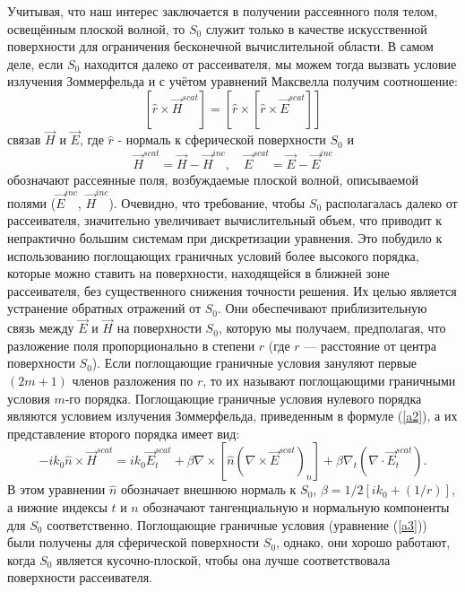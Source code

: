 Учитывая, что наш интерес заключается в получении рассеянного поля телом, освещённым плоской волной, то $S_{0}$ служит только в качестве искусственной поверхности для ограничения бесконечной вычислительной области. В самом деле, если $S_{0}$ находится далеко от рассеивателя, мы можем тогда вызвать условие излучения Зоммерфельда и с учётом уравнений Максвелла получим соотношение:
\begin{equation}\label{a2}
	\left[\hat{r} \times \vec{H}^{scat}\right] = \left[\hat{r} \times \left[\hat{r} \times \vec{E}^{scat}\right]\right]
\end{equation}
		связав $ \vec{H} $ и $ \vec{E} $, где $ \hat{r} $ - нормаль к сферической поверхности $ S_{0} $ и
\begin{equation}
	\vec{H}^{scat} = \vec{H} - \vec{H}^{inc},\quad \vec{E}^{scat} = \vec{E} - \vec{E}^{inc}
\end{equation}
обозначают рассеянные поля, возбуждаемые плоской волной, описываемой полями ($ \vec{E}^{inc} $, $ \vec{H}^{inc} $).
Очевидно, что требование, чтобы $ S_{0} $ располагалась далеко от рассеивателя, значительно увеличивает вычислительный объем, что приводит к непрактично большим системам при дискретизации уравнения. Это побудило к использованию поглощающих граничных условий более высокого порядка, которые можно ставить на поверхности, находящейся в ближней зоне рассеивателя, без существенного снижения точности решения. Их целью является устранение обратных отражений от $ S_{0} $. Они обеспечивают приблизительную связь между $\vec{E}$ и $\vec{H}$ на поверхности $ S_{0} $, которую мы получаем, предполагая, что разложение поля пропорционально в степени $r$ (где $r$ --- расстояние от центра поверхности $S_{0}$). Если поглощающие граничные условия зануляют первые $(2m + 1)$ членов разложения по $r$, то их называют поглощающими граничными условия $m$-го порядка.
Поглощающие граничные условия нулевого порядка являются условием излучения Зоммерфельда, приведенным в формуле (\ref{a2}), а их представление второго порядка имеет вид:
\begin{equation}\label{a3}
	-i k_{0}\hat{n} \times \vec{H}^{scat} = i k_{0}\vec{E}_{t}^{scat} + \beta \nabla \times [\hat{n}(\nabla \times \vec{E}^{scat})_{n}] + \beta\nabla_{t} (\nabla \cdot \vec{E}_{t}^{scat}).
\end{equation}
В этом уравнении $ \hat{n} $ обозначает внешнюю нормаль к $S_{0}$, $\beta = 1/{2[i k_{0} + (1/r)]}$, а нижние индексы $t$ и $n$ обозначают тангенциальную и нормальную компоненты для $ S_{0} $ соответственно. 
Поглощающие граничные условия (уравнение (\ref{a3})) были получены для сферической поверхности $ S_{0} $, однако, они хорошо работают, когда $ S_{0} $ является кусочно-плоской, чтобы она лучше соответствовала поверхности рассеивателя.
